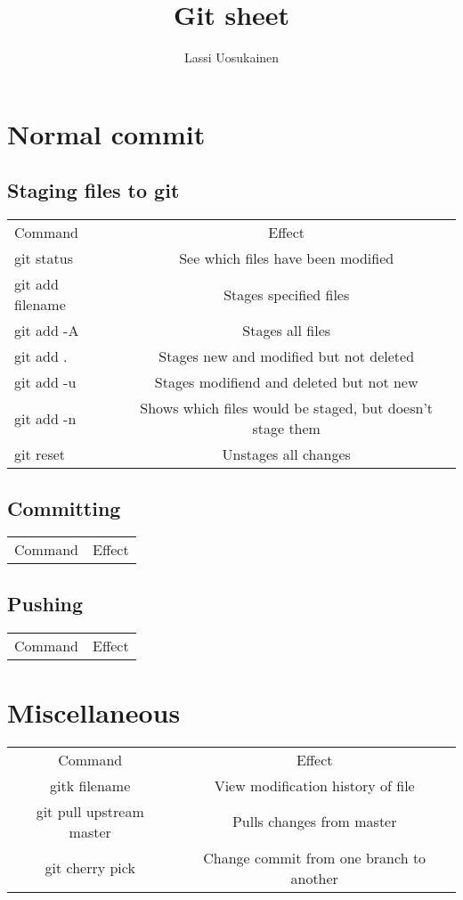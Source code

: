 \documentclass{a0poster}
\begin{document}
\title{Git sheet}
\author{Lassi Uosukainen}
\maketitle

\section{Normal commit}
\subsection{Staging files to git}
\begin{tabular}{l  c}
Command & Effect\\
git status & See which files have been modified\\
git add filename & Stages specified files\\
git add -A & Stages all files\\
git add . & Stages new and modified but not deleted\\
git add -u & Stages modifiend and deleted but not new\\
git add -n & Shows which files would be staged, but doesn't stage them\\
git reset & Unstages all changes\\

\end{tabular}

\subsection{Committing}
\begin{tabular}{l  c}
Command & Effect\\

\end{tabular}
\subsection{Pushing}
\begin{tabular}{l  c}
Command & Effect\\

\end{tabular}

\section{Miscellaneous}
\begin{tabular}{c c}
Command & Effect\\
gitk filename & View modification history of file\\
git pull upstream master & Pulls changes from master\\
git cherry pick & Change commit from one branch to another\\

\end{tabular}
\end{document}
